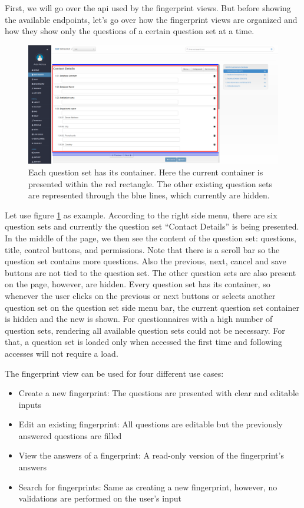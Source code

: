 First, we will go over the \gls{api} used by the fingerprint views.
But before showing the available endpoints, let's go over how the fingerprint views are organized and how they show only the questions of a certain question set at a time.

\begin{figure}[h]
    \center
    \includegraphics[width=\textwidth]{fingerprint-hidden-question-sets}
    \caption{Each question set has its container.
    Here the current container is presented within the red rectangle.
    The other existing question sets are represented through the blue lines, which currently are hidden.}
    \label{fig:fingerprint-hidden-question-sets}
\end{figure}

Let use figure \ref{fig:fingerprint-hidden-question-sets} as example.
According to the right side menu, there are six question sets and currently the question set ``Contact Details'' is being presented.
In the middle of the page, we then see the content of the question set: questions, title, control buttons, and permissions.
Note that there is a scroll bar so the question set contains more questions.
Also the previous, next, cancel and save buttons are not tied to the question set.
The other question sets are also present on the page, however, are hidden.
Every question set has its container, so whenever the user clicks on the previous or next buttons or selects another question set on the question set side menu bar, the current question set container is hidden and the new is shown.
For questionnaires with a high number of question sets, rendering all available question sets could not be necessary.
For that, a question set is loaded only when accessed the first time and following accesses will not require a load.

The fingerprint view can be used for four different use cases:
\begin{itemize}
    \item Create a new fingerprint: The questions are presented with clear and editable inputs
    \item Edit an existing fingerprint: All questions are editable but the previously answered questions are filled
    \item View the answers of a fingerprint: A read-only version of the fingerprint's answers
    \item Search for fingerprints: Same as creating a new fingerprint, however, no validations are performed on the user's input
\end{itemize}

